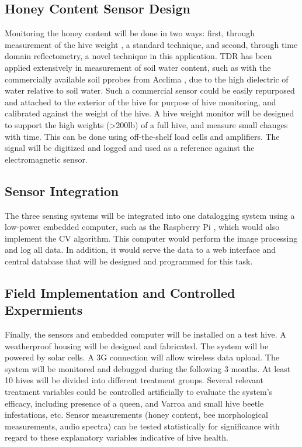 \subsection{Honey Content Sensor Design}
Monitoring the honey content will be done in two ways: first, through measurement of the hive weight \cite{meikle2008within}, a standard technique, and second, through time domain reflectometry, a novel technique in this application. TDR has been applied extensively in measurement of soil water content, such as with the commercially available soil pprobes from Acclima \cite{blonquist2005time}, due to the high dielectric of water relative to soil water. Such a commercial sensor could be easily repurposed and attached to the exterior of the hive for purpose of hive monitoring, and calibrated against the weight of the hive. A hive weight monitor will be designed to support the high weights (>200lb) of a full hive, and measure small changes with time. This can be done using off-the-shelf load cells and amplifiers. The signal will be digitized and logged and used as a reference against the electromagnetic sensor.

\subsection{Sensor Integration}

The three sensing systems will be integrated into one datalogging system using a low-power embedded computer, such as the Raspberry Pi \cite{upton2014raspberry}, which would also implement the CV algorithm. This computer would perform the image processing and log all data. In addition, it would serve the data to a web interface and central database that will be designed and programmed for this task. 

\subsection{Field Implementation and Controlled Expermients}

Finally, the sensors and embedded computer will be installed on a test hive. A weatherproof housing will be designed and fabricated.  The system will be powered by solar cells. A 3G connection will allow wireless data upload. The system will be monitored and debugged during the following 3 months. At least 10 hives will be divided into different treatment groups. Several relevant treatment variables could be controlled
artificially to evaluate the system’s efficacy, including presence of a queen, and Varroa and small hive beetle infestations, etc. Sensor measurements (honey content, bee morphological measurements, audio spectra) can be tested statistically for significance with regard to these explanatory variables indicative of hive health.

